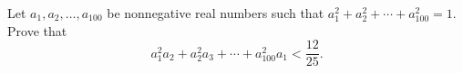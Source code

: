 Let $a_1, a_2, \ldots, a_{100}$ be nonnegative real numbers such that $a_1^2 + a_2^2 + \cdots + a_{100}^2 = 1$. Prove that
\[
a_1^2 a_2 + a_2^2 a_3 + \cdots + a_{100}^2 a_1 < \frac{12}{25}.
\]
